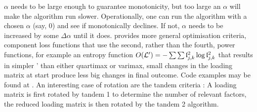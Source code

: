 \( \alpha \) needs to be large enough to guarantee monotonicity, but too large an \(\alpha \) will make the algorithm run slower. Operationally, one can run the algorithm with a chosen \( \alpha \) (say, 0) and see if  monotonically declines. If not, \( \alpha \) needs to be increased by some \( \Delta\alpha \) until it does. \parencite{Jen-04,Ber-05} provides more general optimisation criteria, component loss functions that use the second, rather than the fourth, power functions, for example an entropy function \( O(\mathcal{L}') = -\sum{\sum{\ensuremath{\mathfrak{l}}^2_{j,k} \log{\ensuremath{\mathfrak{l}}^2_{j,k}}}} \) that results in simpler ' than either quartimax or varimax, small changes in the loading matrix at start produce less big changes in final outcome. Code examples may be found at \parencite{Ber-05a}. An interesting case of rotation are the tandem criteria \parencite{Com-67}: A loading matrix is first rotated by tandem 1 to determine the number of relevant factors, the reduced loading matrix is then rotated by the tandem 2 algorithm.

